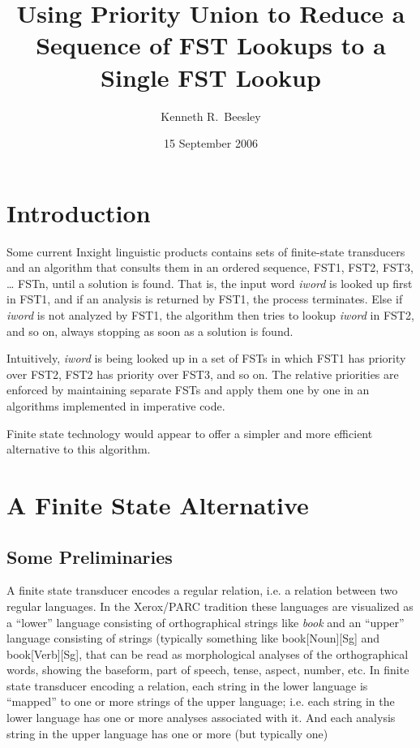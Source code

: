 \documentclass[letterpaper,12pt]{article}
\title{Using Priority Union to Reduce a Sequence of FST Lookups to a Single
  FST Lookup}
\author{Kenneth R.~Beesley}
\date{15 September 2006}
\begin{document}
\maketitle

\section{Introduction}

Some current Inxight linguistic products contains sets of finite-state
transducers and an algorithm that consults them in an ordered
sequence, FST1, FST2, FST3, \dots{} FSTn, until a solution is found.
That is, the input word \emph{iword} is looked up first in FST1, and
if an analysis is returned by FST1, the process terminates.  Else if
\emph{iword} is not analyzed by FST1, the algorithm then tries to lookup
\emph{iword} in FST2, and so on, always stopping as soon as a solution
is found.

Intuitively, \emph{iword} is being looked up in a set of
FSTs in which FST1 has priority over FST2, FST2 has priority over
FST3, and so on.  The relative priorities are enforced by maintaining
separate FSTs and apply them one by one in an algorithms implemented
in imperative code.

Finite state technology would appear to offer a simpler and more
efficient alternative to this algorithm.

\section{A Finite State Alternative}

\subsection{Some Preliminaries}

A finite state transducer encodes a regular relation, i.e. a relation
between two regular languages.  In the Xerox/PARC tradition these
languages are visualized as a ``lower'' language consisting of
orthographical strings like \emph{book} and an ``upper'' language
consisting of strings (typically something like  book[Noun][Sg] and book[Verb][Sg],
that can be read as morphological analyses of the orthographical
words, showing the baseform, part of speech, tense, aspect, number,
etc.  In finite state transducer encoding a relation,
each string in the lower language is ``mapped'' to one or more strings
of the upper language; i.e. each string in the lower language has one
or more analyses associated with it.  And each analysis string in the
upper language has one or more (but typically one) 
\end{document}
